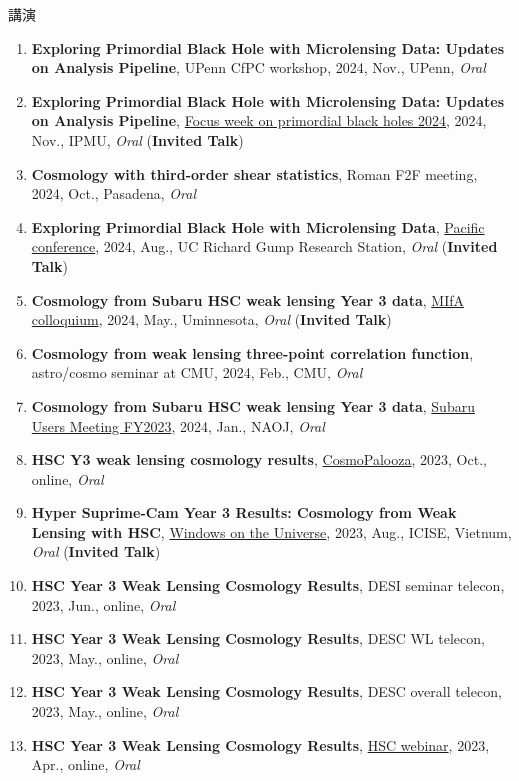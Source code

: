 \begin{rSection}{講演}
\begin{enumerate}[itemsep=0pt, parsep=0pt, topsep=0pt, partopsep=0pt]
\item \textbf{Exploring Primordial Black Hole with Microlensing Data: Updates on Analysis Pipeline}, UPenn CfPC workshop, 2024, Nov., UPenn, \textit{Oral}
\item \textbf{Exploring Primordial Black Hole with Microlensing Data: Updates on Analysis Pipeline}, \href{https://indico.ipmu.jp/event/439/overview}{Focus week on primordial black holes 2024}, 2024, Nov., IPMU, \textit{Oral} (\textbf{Invited Talk})
\item \textbf{Cosmology with third-order shear statistics}, Roman F2F meeting, 2024, Oct., Pasadena, \textit{Oral}
\item \textbf{Exploring Primordial Black Hole with Microlensing Data}, \href{https://pacific-conference.pa.ucla.edu/index.html}{Pacific conference}, 2024, Aug., UC Richard Gump Research Station, \textit{Oral} (\textbf{Invited Talk})
\item \textbf{Cosmology from Subaru HSC weak lensing Year 3 data}, \href{https://cse.umn.edu/physics/minnesota-institute-astrophysics-mifa-colloquium}{MIfA colloquium}, 2024, May., Uminnesota, \textit{Oral} (\textbf{Invited Talk})
\item \textbf{Cosmology from weak lensing three-point correlation function}, astro/cosmo seminar at CMU, 2024, Feb., CMU, \textit{Oral}
\item \textbf{Cosmology from Subaru HSC weak lensing Year 3 data}, \href{https://www.subarutelescope.org/Science/SubaruUM/SubaruUM2023/index.html}{Subaru Users Meeting FY2023}, 2024, Jan., NAOJ, \textit{Oral}
\item \textbf{HSC Y3 weak lensing cosmology results}, \href{https://cosmopalooza.lbl.gov/}{CosmoPalooza}, 2023, Oct., online, \textit{Oral}
\item \textbf{Hyper Suprime-Cam Year 3 Results: Cosmology from Weak Lensing with HSC}, \href{http://vietnam.in2p3.fr/2023/windows/index.html}{Windows on the Universe}, 2023, Aug., ICISE, Vietnum, \textit{Oral} (\textbf{Invited Talk})
\item \textbf{HSC Year 3 Weak Lensing Cosmology Results}, DESI seminar telecon, 2023, Jun., online, \textit{Oral}
\item \textbf{HSC Year 3 Weak Lensing Cosmology Results}, DESC WL telecon, 2023, May., online, \textit{Oral}
\item \textbf{HSC Year 3 Weak Lensing Cosmology Results}, DESC overall telecon, 2023, May., online, \textit{Oral}
\item \textbf{HSC Year 3 Weak Lensing Cosmology Results}, \href{https://hsc-release.mtk.nao.ac.jp/doc/index.php/wly3/}{HSC webinar}, 2023, Apr., online, \textit{Oral}

\end{enumerate}
\end{rSection}
